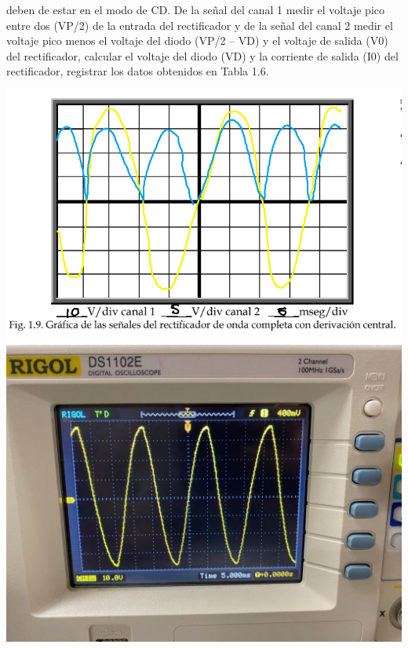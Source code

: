 \documentclass[12pt]{article}
\begin{document}
\begin{enumerate}
\begin{enumerate}
                deben de estar en el modo de CD. De la señal del canal 1 medir el voltaje pico entre dos
                (VP/2) de la entrada del rectificador y de la señal del canal 2 medir el voltaje pico menos el
                voltaje del diodo (VP/2 – VD) y el voltaje de salida (V0) del rectificador, calcular el voltaje
                del diodo (VD) y la corriente de salida (I0) del rectificador, registrar los datos obtenidos en
                Tabla 1.6.
                \begin{center}
                    \includegraphics*[scale=0.57]{fig1-9.png}
                    \includegraphics*[scale=0.27]{img1-90.jpg}

\end{center}
\end{enumerate}
\end{enumerate}
\end{document}
